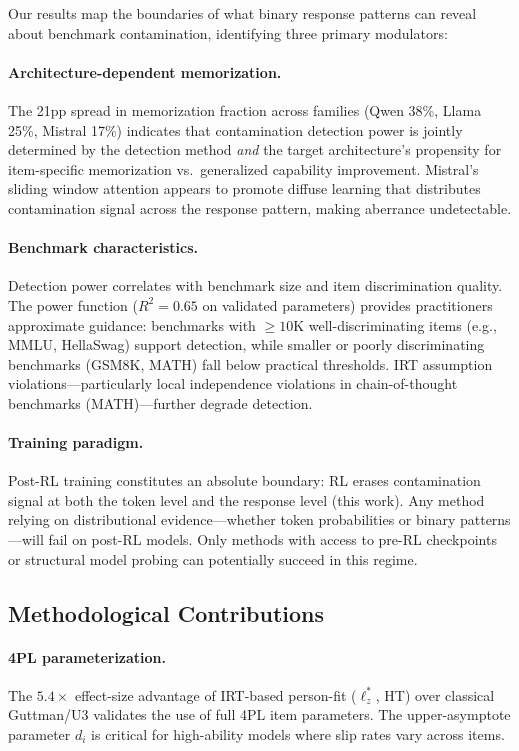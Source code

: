 \documentclass[11pt,a4paper]{article}
\begin{document}
Our results map the boundaries of what binary response patterns can reveal about benchmark contamination, identifying three primary modulators:

\paragraph{Architecture-dependent memorization.}
The 21pp spread in memorization fraction across families (Qwen 38\%, Llama 25\%, Mistral 17\%) indicates that contamination detection power is jointly determined by the detection method \emph{and} the target architecture's propensity for item-specific memorization vs.\ generalized capability improvement.
Mistral's sliding window attention appears to promote diffuse learning that distributes contamination signal across the response pattern, making aberrance undetectable.

\paragraph{Benchmark characteristics.}
Detection power correlates with benchmark size and item discrimination quality.
The power function ($R^2=0.65$ on validated parameters) provides practitioners approximate guidance: benchmarks with ${\geq}10$K well-discriminating items (e.g., MMLU, HellaSwag) support detection, while smaller or poorly discriminating benchmarks (GSM8K, MATH) fall below practical thresholds.
IRT assumption violations---particularly local independence violations in chain-of-thought benchmarks (MATH)---further degrade detection.

\paragraph{Training paradigm.}
Post-RL training constitutes an absolute boundary: RL erases contamination signal at both the token level \citep{wang2025rlmia} and the response level (this work).
Any method relying on distributional evidence---whether token probabilities or binary patterns---will fail on post-RL models.
Only methods with access to pre-RL checkpoints or structural model probing can potentially succeed in this regime.

\subsection{Methodological Contributions}

\paragraph{4PL parameterization.}
The $5.4\times$ effect-size advantage of IRT-based person-fit ($\ell_z^{*}$, HT) over classical Guttman/U3 validates the use of full 4PL item parameters.
The upper-asymptote parameter $d_i$ is critical for high-ability models where slip rates vary across items.
\end{document}
